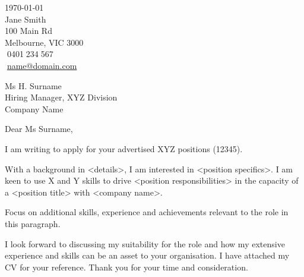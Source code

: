 \documentclass[a4paper,10.5pt,oneside]{article}
\begin{document}
\setlength\parindent{0cm}


\begin{flushleft}
 \today                           \\
 \vspace{1em}   
 Jane Smith \\                           
 100 Main Rd  \\
 Melbourne, VIC 3000   \\
\textcolor{gray}{\faPhone}$\;$0401$\;$234$\;$567        \\
\textcolor{gray}{\faEnvelope}$\;$\href{mailto:name@domain.com}{name@domain.com}  \\ %
\end{flushleft}


\begin{flushleft}
 Ms H. Surname \\
{Hiring Manager, XYZ Division}         \\
 Company Name\\
 
\end{flushleft}

\vspace{2em}

Dear Ms Surname, \\

\onehalfspacing

\indent I am writing to apply for your advertised XYZ positions (12345).

\vspace{1em}

\indent With a background in <details>, I am interested in <position specifics>.   I am keen to use X and Y skills to drive <position responsibilities> in the capacity of a <position title> with <company name>.

\vspace{1em}

\indent Focus on additional skills, experience and achievements relevant to the role in this paragraph.


\vspace{1em}

\indent I look forward to discussing my suitability for the role and how my extensive experience and skills can be an asset to your organisation.  I have attached my CV for your reference.  Thank you for your time and consideration.
\end{document}
